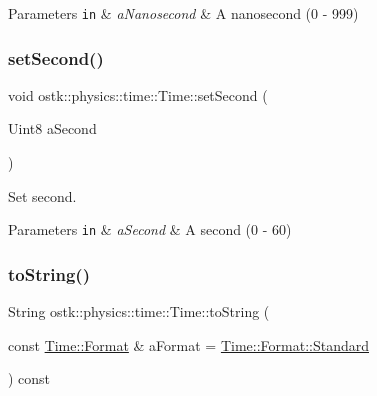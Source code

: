 \begin{DoxyParams}[1]{Parameters}
\mbox{\tt in}  & {\em a\+Nanosecond} & A nanosecond (0 -\/ 999) \\
\hline
\end{DoxyParams}
\mbox{\label{classostk_1_1physics_1_1time_1_1_time_a4f5cc2bb2a6ff653eca82e5a754fa781}} 
\subsubsection{\texorpdfstring{set\+Second()}{setSecond()}}
{\footnotesize\ttfamily void ostk\+::physics\+::time\+::\+Time\+::set\+Second (\begin{DoxyParamCaption}\item[{Uint8}]{a\+Second }\end{DoxyParamCaption})}



Set second. 


\begin{DoxyParams}[1]{Parameters}
\mbox{\tt in}  & {\em a\+Second} & A second (0 -\/ 60) \\
\hline
\end{DoxyParams}
\mbox{\label{classostk_1_1physics_1_1time_1_1_time_a33adb26e33abdfa65581626372f430bd}} 
\subsubsection{\texorpdfstring{to\+String()}{toString()}}
{\footnotesize\ttfamily String ostk\+::physics\+::time\+::\+Time\+::to\+String (\begin{DoxyParamCaption}\item[{const \hyperlink{classostk_1_1physics_1_1time_1_1_time_a207e776746c45c3aaffcf7112b2bc951}{Time\+::\+Format} \&}]{a\+Format = {\ttfamily \hyperlink{classostk_1_1physics_1_1time_1_1_time_a207e776746c45c3aaffcf7112b2bc951aeb6d8ae6f20283755b339c0dc273988b}{Time\+::\+Format\+::\+Standard}} }\end{DoxyParamCaption}) const}



